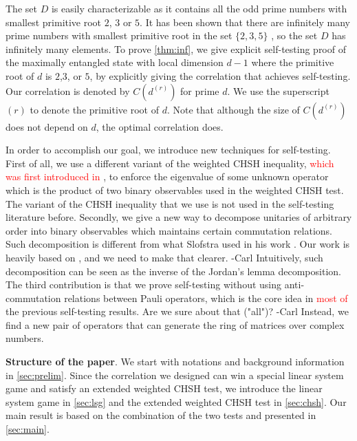\documentclass[11pt,letterpaper]{article}
\newcommand{\1}{\mathbb{1}}
\newcommand{\dr}[1]{d^{(#1)}}
\def\carl#1{{\color{blue} #1 -Carl}}
\newcommand{\hf}[1]{\textcolor{red}{#1}}
\newtheorem{theorem}{Theorem}[section]
\theoremstyle{definition}
\begin{document}
The set $D$ is easily characterizable as it contains all the odd prime numbers with smallest
primitive root $2$, $3$ or $5$. It has been shown that there are infinitely many prime numbers
with smallest primitive root in the set $\{2,3,5\}$ \cite{murty1988}, so the set $D$ has infinitely many elements.
To prove \cref{thm:inf}, we give explicit self-testing proof of 
the maximally entangled state with local dimension $d-1$ where the primitive root of $d$ is $2$,$3$, or $5$, 
by explicitly giving the correlation that achieves self-testing. 
Our correlation is denoted by $C(\dr{r})$ for prime $d$.
We use the superscript $(r)$ to denote the primitive root of $d$.
Note that although the size of $C(\dr{r})$ does not depend on $d$, the optimal correlation does.


In order to accomplish our goal, we introduce new techniques for self-testing.
First of all, we use a different variant of the weighted CHSH inequality, \hf{which was first introduced in \cite{acin2012}}, to enforce the eigenvalue of
some unknown operator which is the product of two binary observables used in the weighted CHSH test.
The variant of the CHSH inequality that we use is not used in the self-testing literature before.
Secondly, we give a new way to decompose unitaries of arbitrary order into binary observables which maintains
certain commutation relations. Such decomposition is different from what Slofstra used in his work \cite{slofstra2017}.
\carl{Our work is heavily based on \cite{slofstra2017}, and we need to make that clearer.}
Intuitively, such decomposition can be seen as the inverse of the Jordan's lemma decomposition.
The third contribution is that we prove self-testing without using anti-commutation relations between Pauli operators, 
which is the core idea in \hf{most of} the previous self-testing results.
\carl{Are we sure about that ("all")?}
Instead, we find a new pair of operators that can generate the ring of matrices over complex numbers.


\textbf{Structure of the paper}.
We start with notations and background information in \cref{sec:prelim}.
Since the correlation we designed can win a special linear system game and satisfy
an extended weighted CHSH test, we introduce the linear system game
in \cref{sec:lsg} and the extended weighted CHSH test in \cref{sec:chsh}. 
Our main result is based on the combination of the two tests and presented in \cref{sec:main}. 
\end{document}
